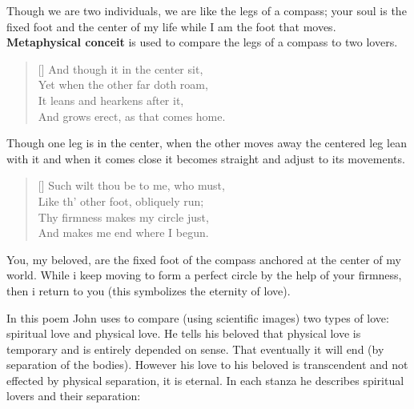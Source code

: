 Though we are two individuals, we are like the legs of a compass;
your soul is the fixed foot and the center of my life while
I am the foot that moves. \textbf{Metaphysical conceit} is used 
to compare the legs of a compass to two lovers.

\begin{verse}[\versewidth]
{\fontverse
And though it in the center sit,\\
\vin Yet when the other far doth roam,\\
It leans and hearkens after it,\\
\vin And grows erect, as that comes home. 
} 
\end{verse}

Though one leg is in the center, when the other moves away the 
centered leg lean with it and when it comes close it 
becomes straight and adjust to its movements. 

\begin{verse}[\versewidth]
{\fontverse
Such wilt thou be to me, who must,\\
\vin Like th' other foot, obliquely run;\\
Thy firmness makes my circle just,\\
\vin And makes me end where I begun.
} 
\end{verse}

You, my beloved, are the fixed foot of the compass anchored at the center of my world.
While i keep moving to form a perfect circle by the help of your firmness, then i return
to you (this symbolizes the eternity of love).


In this poem John uses  to compare (using scientific images)
two types of love: spiritual love and physical love. He tells his beloved that physical 
love is temporary and is entirely depended on sense. That eventually it will end 
(by separation of the bodies). However his love to
his beloved is transcendent and not effected by physical separation, it 
is eternal. In each stanza he describes spiritual lovers and their separation:


